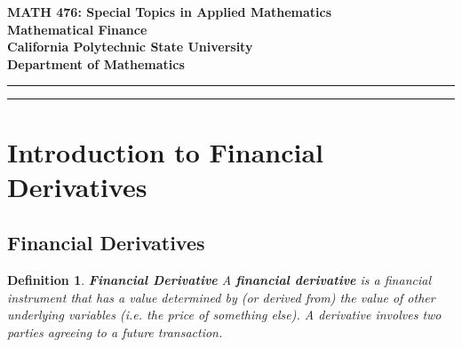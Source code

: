 \documentclass[letterpaper,10pt]{article}
\newtheorem{df}{Definition}[section]
\begin{document}
\setcounter{tocdepth}{2}



\begin{center}

\Large



{\bf MATH 476: Special Topics in Applied Mathematics\\Mathematical Finance}\\

{\bf California Polytechnic State University}\\

{\bf Department of Mathematics}

\end{center}

\bigskip

\hrule

\bigskip


\tableofcontents


\bigskip

\hrule

\bigskip

\newpage



\section{Introduction to Financial Derivatives}



\subsection{Financial Derivatives}


\begin{df}{\bf Financial Derivative}
A {\bf financial derivative} is a financial instrument that has a value determined by (or {\em derived from}) the value of other underlying variables (i.e. the price of something else).  A derivative involves two parties agreeing to a future transaction.
\end{df}
\end{document}
